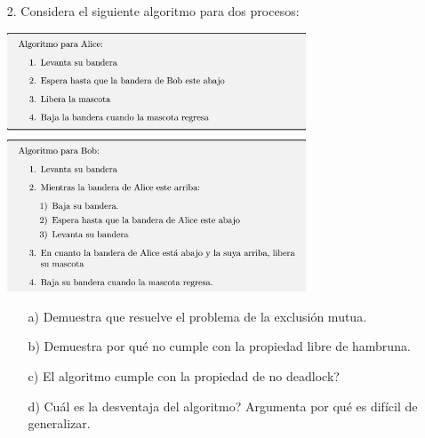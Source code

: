 \documentclass[12pt, letterpaper]{article}
\begin{document}
\begin{itemize}
\begin{itemize}
\\

\end{itemize}


\item[2. ]Considera el siguiente algoritmo para dos procesos:

\begin{center}
\includegraphics[width=0.7\textwidth]{aliceCode.png}\\
\end{center}



\begin{itemize}

\item[a) ]Demuestra que resuelve el problema de la exclusi\'on mutua.
\item[b) ]Demuestra por qu\'e no cumple con la propiedad libre de hambruna.
\item[c) ]El algoritmo cumple con la propiedad de no deadlock?
\item[d) ]Cu\'al es la desventaja del algoritmo? Argumenta por qu\'e es dif\'icil de
generalizar.
\end{itemize}



\end{itemize}
\end{document}
